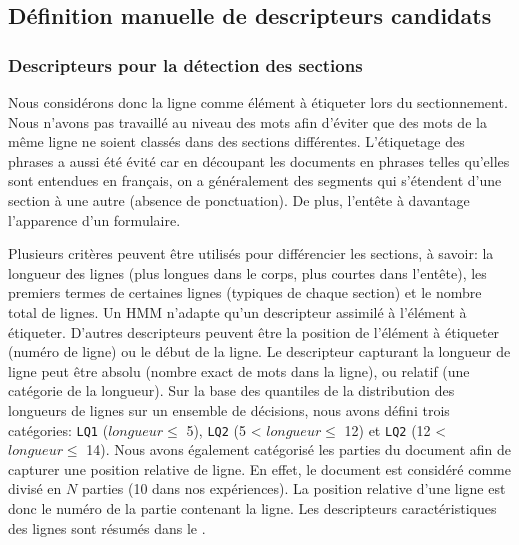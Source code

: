 \subsection{Définition manuelle de descripteurs candidats}

\subsubsection{Descripteurs pour la détection des sections}

Nous considérons donc la ligne comme élément à étiqueter lors du sectionnement. Nous n'avons pas travaillé au niveau des mots afin d'éviter que des mots de la même ligne ne soient classés dans des sections différentes. L'étiquetage des phrases a aussi été évité car en découpant les documents en phrases telles qu'elles sont entendues en français, on a généralement des segments qui s'étendent d'une section à une autre (absence de ponctuation). De plus, l'entête à davantage l'apparence d'un formulaire.

Plusieurs critères peuvent être utilisés pour différencier les sections, à savoir: la longueur des lignes (plus longues dans le corps, plus courtes dans l'entête), les premiers termes de certaines lignes (typiques de chaque section) et le nombre total de lignes. Un HMM n'adapte qu'un descripteur assimilé à l'élément à étiqueter. D'autres descripteurs peuvent être la position de l'élément à étiqueter (numéro de ligne) ou le début de la ligne. Le descripteur capturant la longueur de ligne peut être absolu (nombre exact de mots dans la ligne), ou relatif (une catégorie de la longueur). Sur la base des quantiles de la distribution des longueurs de lignes sur un ensemble de décisions, nous avons défini trois catégories:
\verb|LQ1| ($longueur \leq$ 5), \verb|LQ2| (5 < $longueur \leq$ 12) et \verb|LQ2| (12 < $longueur \leq$ 14). Nous avons également catégorisé les parties du document afin de capturer une position relative de ligne.
En effet, le document est considéré comme divisé en $N$ parties (10 dans nos expériences). La position relative d'une ligne est donc le numéro de la partie contenant la ligne. Les descripteurs caractéristiques des lignes sont résumés dans le .

